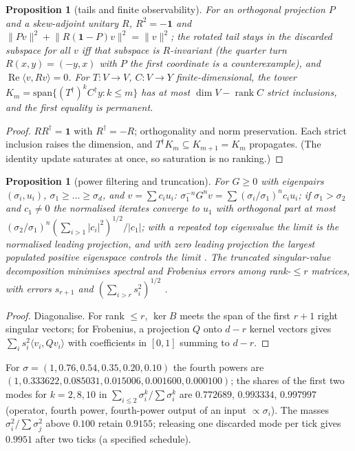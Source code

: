 \documentclass[aps,pra,onecolumn,superscriptaddress,nofootinbib,10pt]{revtex4-2}
\newtheorem{proposition}[theorem]{Proposition}
\theoremstyle{definition}
\theoremstyle{remark}
\newcommand{\rk}{\operatorname{rank}}
\newcommand{\re}{\operatorname{Re}}
\newcommand{\ip}[2]{\langle #1,#2\rangle}
\begin{document}
\begin{proposition}[tails and finite observability]\label{prop:sotails}
For an orthogonal projection $P$ and a skew-adjoint unitary $R$, $R^2=-\mathbf1$ and $\lVert Pv\rVert^2+\lVert R(\mathbf1-P)v\rVert^2=\lVert v\rVert^2$; the rotated tail
stays in the discarded subspace for all $v$ iff that subspace is $R$-invariant (the quarter turn $R(x,y)=(-y,x)$ with $P$
the first coordinate is a counterexample), and $\re\ip v{Rv}=0$.  For $T\colon V\to V$, $C\colon V\to Y$ finite-dimensional, the tower
$K_m=\mathrm{span}\{(T^\dagger)^kC^\dagger y:k\le m\}$ has at most $\dim V-\rk C$ strict inclusions, and the first equality is permanent.
\end{proposition}
\begin{proof}
$RR^\dagger=\mathbf1$ with $R^\dagger=-R$; orthogonality and norm preservation.  Each strict inclusion raises the dimension, and
$T^\dagger K_m\subseteq K_{m+1}=K_m$ propagates.  (The identity update saturates at once, so saturation is no ranking.)
\end{proof}

\begin{proposition}[power filtering and truncation]\label{prop:sopower}
For $G\ge0$ with eigenpairs $(\sigma_i,u_i)$, $\sigma_1\ge\dots\ge\sigma_d$, and $v=\sum c_iu_i$: $\sigma_1^{-n}G^nv=\sum(\sigma_i/\sigma_1)^nc_iu_i$; if $\sigma_1>\sigma_2$ and $c_1\ne0$ the
normalised iterates converge to $u_1$ with orthogonal part at most $(\sigma_2/\sigma_1)^n(\sum_{i>1}\lvert c_i\rvert^2)^{1/2}/\lvert c_1\rvert$; with a repeated
top eigenvalue the limit is the normalised leading projection, and with zero leading projection the
largest populated positive eigenspace controls the limit \cite{n3:vonMises}.  The truncated singular-value
decomposition minimises spectral and Frobenius errors among rank-$\le r$ matrices, with errors $s_{r+1}$ and
$(\sum_{i>r}s_i^2)^{1/2}$ \cite{n3:EckartYoung,n3:Mirsky}.
\end{proposition}
\begin{proof}
Diagonalise.  For rank $\le r$, $\ker B$ meets the span of the first $r+1$ right singular vectors; for Frobenius, a projection
$Q$ onto $d-r$ kernel vectors gives $\sum_is_i^2\ip{v_i}{Qv_i}$ with coefficients in $[0,1]$ summing to $d-r$.
\end{proof}
\noindent For $\sigma=(1,0.76,0.54,0.35,0.20,0.10)$ the fourth powers are $(1,0.333622,0.085031,0.015006,0.001600,0.000100)$; the shares of the first
two modes for $k=2,8,10$ in $\sum_{i\le2}\sigma_i^k/\sum\sigma_i^k$ are $0.772689$, $0.993334$, $0.997997$ (operator, fourth power, fourth-power output of
an input $\propto\sigma_i$).  The masses $\sigma_i^2/\sum\sigma_j^2$ above $0.100$ retain $0.9155$; releasing one discarded mode per tick gives
$0.9951$ after two ticks (a specified schedule).
\end{document}
